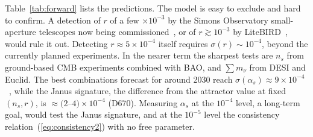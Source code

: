 \documentclass[aps,prd,twocolumn,superscriptaddress,nofootinbib,floatfix]{revtex4-2}
\begin{document}
\begin{table}[tbp]
\begin{ruledtabular}
\end{ruledtabular}
\end{table}

Table~\ref{tab:forward} lists the predictions. The model is easy to exclude and hard to confirm. A detection of $r$ of a few $\times10^{-3}$ by the Simons Observatory small-aperture telescopes now being commissioned~\cite{arXiv_2609_26938}, or of $r\gtrsim10^{-3}$ by LiteBIRD~\cite{arXiv_2202_02773}, would rule it out. Detecting $r\approx5\times10^{-4}$ itself requires $\sigma(r)\sim10^{-4}$, beyond the currently planned experiments. In the nearer term the sharpest tests are $n_s$ from ground-based CMB experiments combined with BAO, and $\sum m_\nu$ from DESI and Euclid. The best combinations forecast for around 2030 reach $\sigma(\alpha_s)\approx9\times10^{-4}$~\cite{arXiv_2212_04115}, while the Janus signature, the difference from the attractor value at fixed $(n_s,r)$, is $\approx(2$--$4)\times10^{-4}$ (D670). Measuring $\alpha_s$ at the $10^{-4}$ level, a long-term goal, would test the Janus signature, and at the $10^{-5}$ level the consistency relation~(\ref{eq:consistency2}) with no free parameter.
\end{document}
